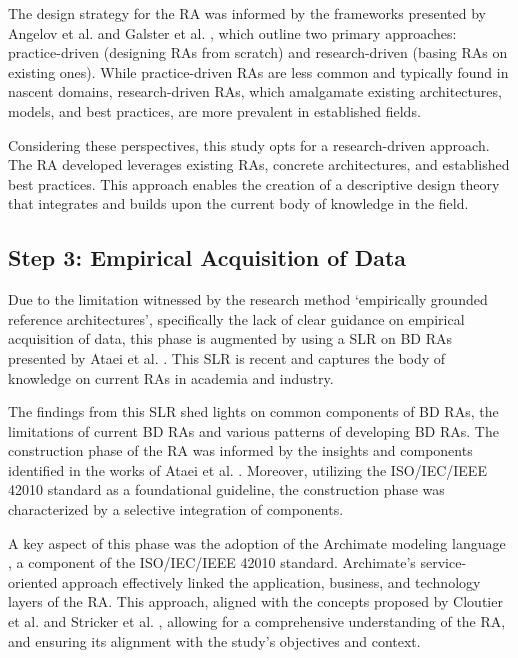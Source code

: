 \documentclass[review]{elsarticle}
\begin{document}
The design strategy for the RA was informed by the frameworks presented by Angelov et al. \cite{angelov2008towards} and Galster et al. \cite{galster2011empirically}, which outline two primary approaches: practice-driven (designing RAs from scratch) and research-driven (basing RAs on existing ones). While practice-driven RAs are less common and typically found in nascent domains, research-driven RAs, which amalgamate existing architectures, models, and best practices, are more prevalent in established fields.

Considering these perspectives, this study opts for a research-driven approach. The RA developed leverages existing RAs, concrete architectures, and established best practices. This approach enables the creation of a descriptive design theory that integrates and builds upon the current body of knowledge in the field.


\subsection{Step 3: Empirical Acquisition of Data } \label{theSLR}

 Due to the limitation witnessed by the research method 
`empirically grounded reference architectures', specifically the lack of clear guidance on empirical acquisition of data, this phase is augmented by using a SLR on BD RAs presented by Ataei et al. \cite{ataei2022state}. This SLR is recent and captures the body of knowledge on current RAs in academia and industry.

The findings from this SLR shed lights on common components of BD RAs, the limitations of current BD RAs and various patterns of developing BD RAs. The construction phase of the RA was informed by the insights and components identified in the works of Ataei et al. \cite{ataei2022state}. Moreover, utilizing the ISO/IEC/IEEE 42010 standard \cite{ISO42010} as a foundational guideline, the construction phase was characterized by a selective integration of components.

A key aspect of this phase was the adoption of the Archimate modeling language \cite{lankhorst2013language}, a component of the ISO/IEC/IEEE 42010 standard. Archimate's service-oriented approach effectively linked the application, business, and technology layers of the RA. This approach, aligned with the concepts proposed by Cloutier et al. \cite{Cloutier} and Stricker et al. \cite{Stricker}, allowing for a comprehensive understanding of the RA, and ensuring its alignment with the study's objectives and context.
\end{document}
